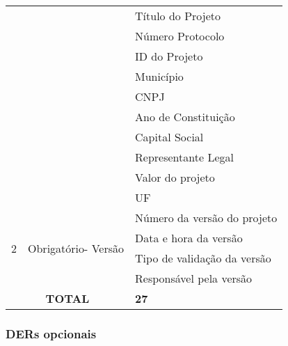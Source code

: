 \begin{table}[!h]
\begin{tabular}{|c|c|l|}
			      &   & Título do Projeto                                   \\ \cline{3-3}
			      &   & Número Protocolo                                    \\ \cline{3-3}
			      &   & ID do Projeto                                       \\ \cline{3-3}
			      &   & Município                                           \\ \cline{3-3}
			      &   & CNPJ                                                \\ \cline{3-3}
			      &   & Ano de Constituição                                 \\ \cline{3-3}
			      &   & Capital Social                                      \\ \cline{3-3}
			      &   & Representante Legal                                 \\ \cline{3-3}
			      &   & Valor do projeto                                    \\ \cline{3-3}

			      &   & UF                                                  \\ \hline   
	  \multirow{4}{*}{2}        & \multirow{4}{*}{Obrigatório- Versão} & Número da versão do projeto \\ \cline{3-3} 
				      &                              & Data e hora da versão       \\ \cline{3-3} 
				      &                              & Tipo de validação da versão \\ \cline{3-3} 
				      &                              & Responsável pela versão     \\ \hline
	  \multicolumn{2}{|c|}{\textbf{TOTAL}} & \textbf{27} \\ \hline
	  \end{tabular}
	  \end{table}
      
      \vfill
      \pagebreak
      \subsubsection*{DERs opcionais}
      
